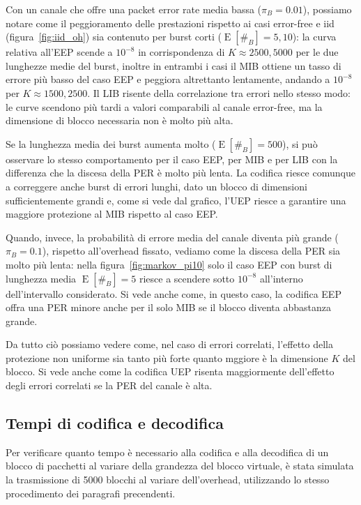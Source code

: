 \documentclass[italian, a4paper, 12pt]{article}
\newcommand{\E}[1]{\operatorname{E}\left[#1\right]}
\newcommand{\EnB}{\E{\#_B}}
\begin{document}
%
Con un canale che offre una packet error rate media bassa ($\pi_B =
0.01$), possiamo notare come il peggioramento delle prestazioni
rispetto ai casi error-free e iid (figura~\ref{fig:iid_oh}) sia
contenuto per burst corti ($\EnB = 5, 10$):
%
la curva relativa all'EEP scende a $10^{-8}$ in corrispondenza di $K
\approx 2500, 5000$ per le due lunghezze medie del burst, inoltre in
entrambi i casi il MIB ottiene un tasso di errore più basso del caso
EEP e peggiora altrettanto lentamente, andando a $10^{-8}$ per $K
\approx 1500, 2500$.
%
Il LIB risente della correlazione tra errori nello stesso modo: le
curve scendono più tardi a valori comparabili al canale error-free, ma
la dimensione di blocco necessaria non è molto più alta.

Se la lunghezza media dei burst aumenta molto ($\EnB = 500$), si può
osservare lo stesso comportamento per il caso EEP, per MIB e per LIB
con la differenza che la discesa della PER è molto più lenta.
%
La codifica riesce comunque a correggere anche burst di errori lunghi,
dato un blocco di dimensioni sufficientemente grandi e, come si vede
dal grafico, l'UEP riesce a garantire una maggiore protezione al MIB
rispetto al caso EEP.

Quando, invece, la probabilità di errore media del canale diventa più
grande ($\pi_B = 0.1$), rispetto all'overhead fissato, vediamo come la
discesa della PER sia molto più lenta: nella
figura~\ref{fig:markov_pi10} solo il caso EEP con burst di lunghezza
media $\EnB = 5$ riesce a scendere sotto $10^{-8}$ all'interno
dell'intervallo considerato.
%
Si vede anche come, in questo caso, la codifica EEP offra una PER
minore anche per il solo MIB se il blocco diventa abbastanza grande.

Da tutto ciò possiamo vedere come, nel caso di errori correlati,
l'effetto della protezione non uniforme sia tanto più forte quanto
mggiore è la dimensione $K$ del blocco.
%
Si vede anche come la codifica UEP risenta maggiormente dell'effetto
degli errori correlati se la PER del canale è alta.

\subsection{Tempi di codifica e decodifica}
Per verificare quanto tempo è necessario alla codifica e alla
decodifica di un blocco di pacchetti al variare della grandezza del
blocco virtuale, è stata simulata la trasmissione di 5000 blocchi al
variare dell'overhead, utilizzando lo stesso procedimento dei
paragrafi precendenti.
\end{document}
